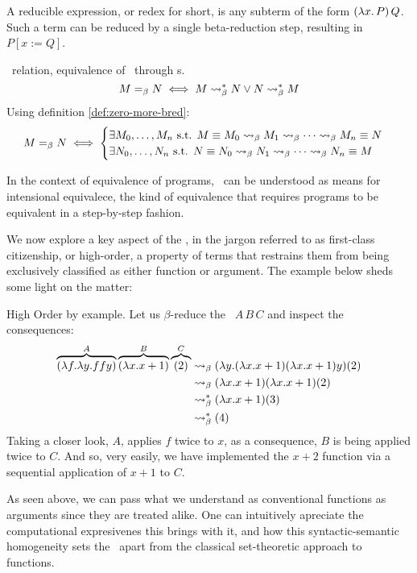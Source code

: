 \begin{definition}
A reducible expression, or redex for short, is any subterm of the form 
\( (\lambda x . \, P) \, Q \). Such a term can be reduced by a single beta-reduction step, resulting in \( P[x := Q] \).
\end{definition}

\begin{definition} \bequiv \ relation, equivalence of \lterms \ through \bred s.
  \[
    M =_\beta N \iff M \mathrel{\leadsto}_\beta^* N \lor N \mathrel{\leadsto}_\beta^* M
  \]
 Using definition \ref{def:zero-more-bred}:
  \[
    M =_\beta N \iff
    \begin{cases}
      \exists M_0, \dots, M_n \text{ s.t. } M \equiv M_0 \mathrel{\leadsto}_\beta M_1 \mathrel{\leadsto}_\beta \cdots \mathrel{\leadsto}_\beta M_n \equiv N \\
      \exists N_0, \dots, N_n \text{ s.t. } N \equiv N_0 \mathrel{\leadsto}_\beta N_1 \mathrel{\leadsto}_\beta \cdots \mathrel{\leadsto}_\beta N_n \equiv M
    \end{cases}
  \]
\end{definition}
\begin{remark}
  In the context of equivalence of programs, \bequiv \ can be understood as means for intensional equivalece, the kind of equivalence that requires programs to be equivalent in a step-by-step fashion.
\end{remark}
We now explore a key aspect of the \lcalc, in the jargon referred to as first-class citizenship, or high-order, a property of terms that restrains them from being exclusively classified as either function or argument. The example below sheds some light on the matter:
\begin{example} High Order by example. Let us $\beta$-reduce the \lterm \ $ A \, B \, C $ and inspect the consequences:
  \label{ex:high-order-by-example}
\begin{align*}
  \overbrace { (\lambda f . \lambda y . f f y) }^{A} \overbrace{ (\lambda x . x + 1) }^{B} \overbrace{(2)}^{C}
  &\mathrel{\leadsto}_\beta (\lambda y .(\lambda x . x + 1) (\lambda x . x + 1)y)(2) \\
  &\mathrel{\leadsto}_\beta (\lambda x . x + 1)(\lambda x . x + 1)(2) \\
  &\mathrel{\leadsto}_\beta^* (\lambda x . x + 1) (3) \\
  &\mathrel{\leadsto}_\beta^* (4)
\end{align*}
Taking a closer look, $A$, applies $f$ twice to $x$, as a consequence, $B$ is being applied twice to $C$. And so, very easily, we have implemented the $ x + 2 $ function via a sequential application of $x + 1$ to $C$.
\end{example}
\begin{remark}
  As seen above, we can pass what we understand as conventional functions as arguments since they are treated alike.  One can intuitively apreciate the computational expresivenes this brings with it, and how this syntactic-semantic homogeneity sets the \lcalc \ apart from the classical set-theoretic approach to functions.
\end{remark}

